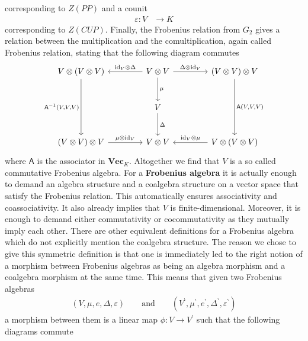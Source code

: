 corresponding to $Z(PP)$ and a counit
\begin{align*}
  \varepsilon
  \colon
  V
  &\to
  K
\end{align*}
corresponding to $Z(CUP)$. Finally, the Frobenius relation from $G_{2}$ gives a relation between the multiplication and the comultiplication, again called Frobenius relation, stating that the following diagram commutes
\begin{equation*}
\begin{tikzcd}[row sep=2.7em,column sep=4.2em]
  V \otimes (V \otimes V)
  \ar{dd}[swap]{\mathsf{A}^{-1}(V,V,V)}
  &
  V \otimes V
  \ar{r}{\Delta \otimes \mathrm{id}_{V}}
  \ar{d}{\mu}
  \ar{l}[swap]{\mathrm{id}_{V} \otimes \Delta}
  &
  (V \otimes V) \otimes V
  \ar{dd}{\mathsf{A}(V,V,V)}
  \\
  &
  V
  \ar{d}{\Delta}
  &
  \\
  (V \otimes V) \otimes V
  \ar{r}{\mu \otimes \mathrm{id}_{V}}
  &
  V \otimes V
  &
  V \otimes (V \otimes V)
  \ar{l}[swap]{\mathrm{id}_{V} \otimes \mu}
\end{tikzcd}
\end{equation*}
where $\mathsf{A}$ is the associator in $\mathbf{Vec}_{K}$. Altogether we find that $V$ is a so called commutative Frobenius algebra. For a \textbf{Frobenius algebra} it is actually enough to demand an algebra structure and a coalgebra structure on a vector space that satisfy the Frobenius relation. This automatically ensures associativity and coassociativity. It also already implies that $V$ is finite-dimensional. Moreover, it is enough to demand either commutativity or cocommutativity as they mutually imply each other. There are other equivalent definitions for a Frobenius algebra which do not explicitly mention the coalgebra structure. The reason we chose to give this symmetric definition is that one is immediately led to the right notion of a morphism between Frobenius algebras as being an algebra morphism and a coalgebra morphism at the same time. This means that given two Frobenius algebras
\begin{align*}
  \left(
    V
    ,
    \mu
    ,
    e
    ,
    \Delta
    ,
    \varepsilon
  \right)
  \qquad
  \text{and}
  \qquad
  \left(
    V^{\backprime}
    ,
    \mu^{\backprime}
    ,
    e^{\backprime}
    ,
    \Delta^{\backprime}
    ,
    \varepsilon^{\backprime}
  \right)
\end{align*}
a morphism between them is a linear map $\phi \colon V \to V^{\backprime}$ such that the following diagrams commute
